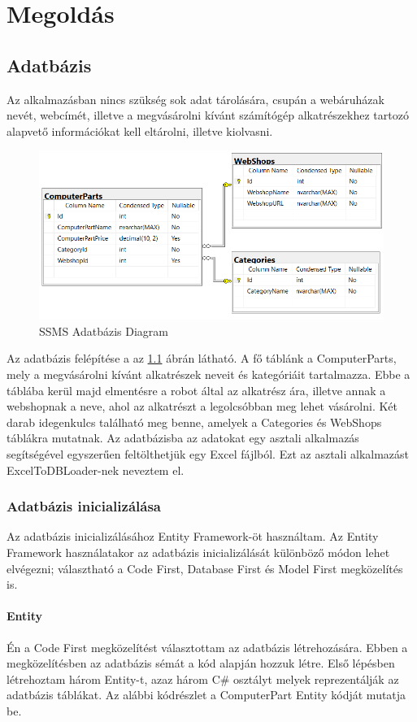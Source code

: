 \documentclass[
]{thesis-ekf}
\theoremstyle{definition}
\theoremstyle{remark}
\begin{document}
\chapter{Megoldás}
\section{Adatbázis}
Az alkalmazásban nincs szükség sok adat tárolására, csupán a webáruházak nevét, webcímét, illetve a megvásárolni kívánt számítógép alkatrészekhez tartozó alapvető információkat kell eltárolni, illetve kiolvasni.
	\begin{figure}[!ht]
		\centering
		\includegraphics[width=15cm]{entity diagram}
		\caption{SSMS Adatbázis Diagram}
		\label{picture-adatbazis}
	\end{figure}
Az adatbázis felépítése a az \ref{picture-adatbazis} ábrán látható. A fő táblánk a ComputerParts, mely a megvásárolni kívánt alkatrészek neveit és kategóriáit tartalmazza. Ebbe a táblába kerül majd elmentésre a robot által az alkatrész ára, illetve annak a webshopnak a neve, ahol az alkatrészt a legolcsóbban meg lehet vásárolni. Két darab idegenkulcs található meg benne, amelyek a Categories és WebShops táblákra mutatnak.
Az adatbázisba az adatokat egy asztali alkalmazás segítségével egyszerűen feltölthetjük egy Excel fájlból. Ezt az asztali alkalmazást ExcelToDBLoader-nek neveztem el.
\subsection{Adatbázis inicializálása}
Az adatbázis inicializálásához Entity Framework-öt használtam. Az Entity Framework használatakor az adatbázis inicializálását különböző módon lehet elvégezni; választható a Code First, Database First és Model First megközelítés is.
\subsubsection{Entity}
Én a Code First megközelítést választottam az adatbázis létrehozására. Ebben a megközelítésben az adatbázis sémát a kód alapján hozzuk létre. Első lépésben létrehoztam három Entity-t, azaz három C\# osztályt melyek reprezentálják az adatbázis táblákat. Az alábbi kódrészlet a ComputerPart Entity kódját mutatja be.
\end{document}
